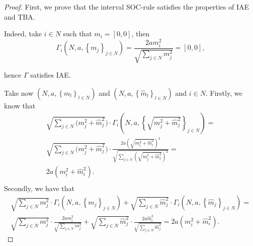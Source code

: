 \documentclass[12pt]{article}
\begin{document}
\begin{proof}
First, we prove that the interval SOC-rule satisfies the properties of IAE and TBA. 





Indeed, take $i\in N$ such that $m_{i}=\left[ 0,0\right]$, then 
\begin{equation*}
\Gamma_i (N,a,\left\{ m_{j}\right\} _{j\in
N})=\frac{2am_{i}^{2}}{\sqrt{\sum_{j\in N}m_{j}^{2}}}=\left[ 0,0\right],
\end{equation*}

hence $\Gamma$ satisfies IAE. 

Take now $(N,a,\left\{ m_{l}\right\}_{l\in N})$ and $(N,a,\left\{ \hat{m}_{l}\right\} _{l\in N})$ and $i\in N$. Firstly, we know that 
\begin{equation*}
\begin{split}
\sqrt{\sum_{j\in N}(m_j^2+\hat{m}_j^2})\cdot \Gamma_i (N,a,\left\{ \sqrt{m^2_{j}+\hat{m}^2_{j}}\right\} _{j\in
N})=\\
\sqrt{\sum_{j\in N}(m_j^2+\hat{m}_j^2})\cdot\frac{2a\left(\sqrt{m^2_{i}+\hat{m}^2_{i}}\right)^{2}}{\sqrt{\sum_{j\in N}\left(\sqrt{m^2_{j}+\hat{m}^2_{j}}\right)^{2}}}=\\
2a\left(m^2_{i}+\hat{m}^2_{i}\right).\\
\end{split}
\end{equation*}%
Secondly, we have that  
\begin{equation*}
\begin{split}
\sqrt{\sum_{j\in N}m_j^2}\cdot \Gamma_i
(N,a,\left\{ m_{j}\right\} _{j\in
N})+\sqrt{\sum_{j\in N}\hat{m}_j^2}\cdot \Gamma_i (N,a,\left\{ \hat{m}_{j}\right\} _{j\in
N})=\\
\sqrt{\sum_{j\in N}m_j^2}\cdot \frac{2am_i^2}{\sqrt{\sum_{j\in N}m_{j}^{2}}}+\sqrt{\sum_{j\in N}\hat{m}_j^2}\cdot \frac{2a\hat{m}_i^2}{\sqrt{\sum_{j\in N}\hat{m}_{j}^{2}}}=
2a\left(m^2_{i}+\hat{m}^2_{i}\right).
\end{split}
\end{equation*}%


\end{proof}
\end{document}
